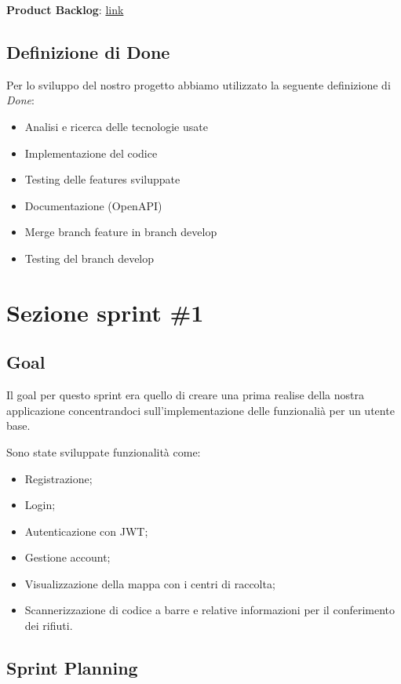\documentclass[12pt,a4paper]{article}
\begin{document}
\textbf{Product Backlog}: \href{https://docs.google.com/spreadsheets/d/125j1VX_FSA3DJzB0BaUx1eusFmqfIbEHgwuWGOA6cfo/edit?gid=824923259#gid=824923259}{link} 

\subsection{Definizione di Done}

Per lo sviluppo del nostro progetto abbiamo utilizzato la seguente definizione di \textit{Done}:
\begin{itemize}
    \item Analisi e ricerca delle tecnologie usate
    \item Implementazione del codice
    \item Testing delle features sviluppate
    \item Documentazione (OpenAPI)
    \item Merge branch feature in branch develop
    \item Testing del branch develop
\end{itemize}

\section{Sezione sprint \#1}

\subsection{Goal}

Il goal per questo sprint era quello di creare una prima realise della nostra applicazione concentrandoci sull'implementazione delle funzionalià per un utente base.

Sono state sviluppate funzionalità come:
\begin{itemize}
    \item Registrazione;
    \item Login;
    \item Autenticazione con JWT;
    \item Gestione account;
    \item Visualizzazione della mappa con i centri di raccolta;
    \item Scannerizzazione di codice a barre e relative informazioni per il conferimento dei rifiuti.
\end{itemize}

\subsection{Sprint Planning}
\end{document}
